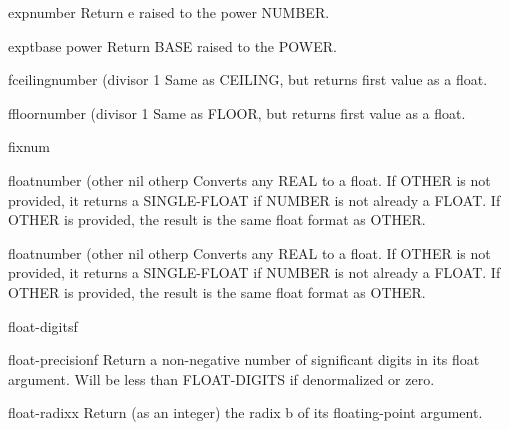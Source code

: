 \begin{function}{exp}{number}{}
  Return e raised to the power NUMBER.
\end{function}

\begin{function}{expt}{base power}{}
  Return BASE raised to the POWER.
\end{function}

\begin{function}{fceiling}{number \op (divisor 1}{}
  Same as CEILING, but returns first value as a float.
\end{function}

\begin{function}{ffloor}{number \op (divisor 1}{}
  Same as FLOOR, but returns first value as a float.
\end{function}

\begin{type}{fixnum}{}{}
  
\end{type}

\begin{function}{float}{number \op (other nil otherp}{}
  Converts any REAL to a float. If OTHER is not provided, it returns a
  SINGLE-FLOAT if NUMBER is not already a FLOAT. If OTHER is provided, the
  result is the same float format as OTHER.
\end{function}

\begin{class}{float}{number \op (other nil otherp}{}
  Converts any REAL to a float. If OTHER is not provided, it returns a
  SINGLE-FLOAT if NUMBER is not already a FLOAT. If OTHER is provided, the
  result is the same float format as OTHER.
\end{class}

\begin{function}{float-digits}{f}{}
  
\end{function}

\begin{function}{float-precision}{f}{}
  Return a non-negative number of significant digits in its float argument.
  Will be less than FLOAT-DIGITS if denormalized or zero.
\end{function}

\begin{function}{float-radix}{x}{}
  Return (as an integer) the radix b of its floating-point argument.
\end{function}

